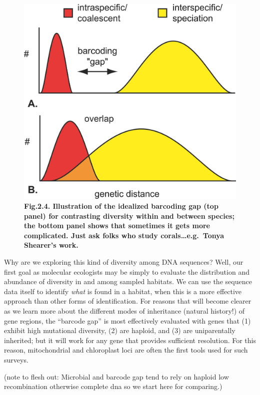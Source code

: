 \documentclass[
]{article}
\begin{document}
\begin{figure}
\centering
\includegraphics{MEImages/MeyerPaulaygap.jpg}
\caption{\textbf{Fig.2.4. Illustration of the idealized barcoding gap
(top panel) for contrasting diversity within and between species; the
bottom panel shows that sometimes it gets more complicated. Just ask
folks who study corals\ldots e.g.~Tonya Shearer's work.}}
\end{figure}

Why are we exploring this kind of diversity among DNA sequences? Well,
our first goal as molecular ecologists may be simply to evaluate the
distribution and abundance of diversity in and among sampled habitats.
We can use the sequence data itself to identify \emph{what} is found in
a habitat, when this is a more effective approach than other forms of
identification. For reasons that will become clearer as we learn more
about the different modes of inheritance (natural history!) of gene
regions, the ``barcode gap'' is most effectively evaluated with genes
that (1) exhibit high mutational diversity, (2) are haploid, and (3) are
uniparentally inherited; but it will work for any gene that provides
sufficient resolution. For this reason, mitochondrial and chloroplast
loci are often the first tools used for such surveys.

(note to flesh out: Microbial and barcode gap tend to rely on haploid
low recombination otherwise complete dna so we start here for
comparing.)
\end{document}

